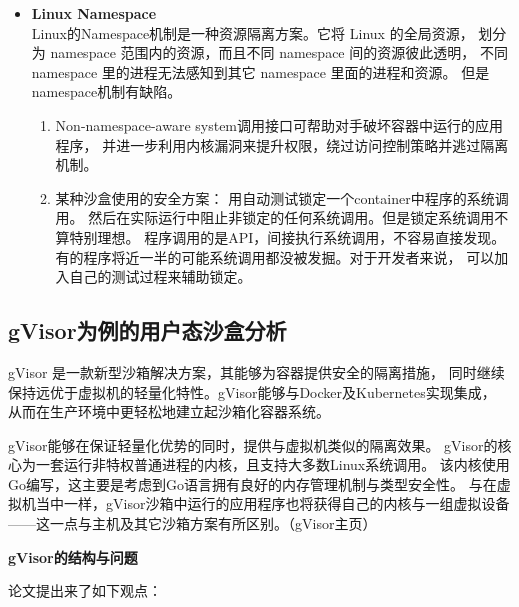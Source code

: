 \documentclass[AutoFakeBold,a4paper]{ctexart}
\begin{document}
\begin{itemize}
    \item \textbf{Linux Namespace}\\
    Linux的Namespace机制是一种资源隔离方案。它将 Linux 的全局资源，
    划分为 namespace 范围内的资源，而且不同 namespace 间的资源彼此透明，
    不同 namespace 里的进程无法感知到其它 namespace 里面的进程和资源。
    但是namespace机制有缺陷。
    \begin{enumerate}
        \item Non-namespace-aware system调用接口可帮助对手破坏容器中运行的应用程序，
        并进一步利用内核漏洞来提升权限，绕过访问控制策略并逃过隔离机制。\cite{2019Practical}
        \item 某种沙盒使用的安全方案\cite{2019Practical}：
        用自动测试锁定一个container中程序的系统调用。
        然后在实际运行中阻止非锁定的任何系统调用。但是锁定系统调用不算特别理想。
        程序调用的是API，间接执行系统调用，不容易直接发现。
        有的程序将近一半的可能系统调用都没被发掘。对于开发者来说，
        可以加入自己的测试过程来辅助锁定。
    \end{enumerate}

\end{itemize}

\subsection{gVisor为例的用户态沙盒分析}
gVisor 是一款新型沙箱解决方案，其能够为容器提供安全的隔离措施，
同时继续保持远优于虚拟机的轻量化特性。gVisor能够与Docker及Kubernetes实现集成，
从而在生产环境中更轻松地建立起沙箱化容器系统。

gVisor能够在保证轻量化优势的同时，提供与虚拟机类似的隔离效果。
gVisor的核心为一套运行非特权普通进程的内核，且支持大多数Linux系统调用。
该内核使用Go编写，这主要是考虑到Go语言拥有良好的内存管理机制与类型安全性。
与在虚拟机当中一样，gVisor沙箱中运行的应用程序也将获得自己的内核与一组虚拟设备
——这一点与主机及其它沙箱方案有所区别。（gVisor主页）

\textbf{gVisor的结构与问题}

论文\cite{234857}提出来了如下观点：
\end{document}
